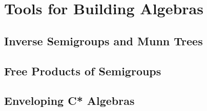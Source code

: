 \documentclass[a4paper,oneside,12pt]{report}
\begin{document}
\section{Tools for Building Algebras}

\subsection{Inverse Semigroups and Munn Trees}

\subsection{Free Products of Semigroups}

\subsection{Enveloping C* Algebras}

\printindex
\end{document}
